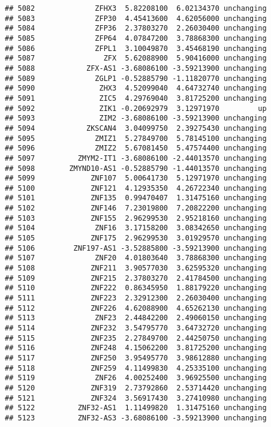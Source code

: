 \documentclass[]{article}
\begin{document}
\begin{verbatim}
## 5082              ZFHX3  5.82208100  6.02134370 unchanging
## 5083              ZFP30  4.45413600  4.62056000 unchanging
## 5084              ZFP36  2.37803270  2.26030400 unchanging
## 5085              ZFP64  4.07847200  3.78868300 unchanging
## 5086              ZFPL1  3.10049870  3.45468190 unchanging
## 5087                ZFX  5.62088900  5.90416000 unchanging
## 5088            ZFX-AS1 -3.68086100 -3.59213900 unchanging
## 5089              ZGLP1 -0.52885790 -1.11820770 unchanging
## 5090               ZHX3  4.52099040  4.64732740 unchanging
## 5091               ZIC5  4.29769040  3.81725200 unchanging
## 5092               ZIK1 -0.20692979  3.12971970         up
## 5093               ZIM2 -3.68086100 -3.59213900 unchanging
## 5094            ZKSCAN4  3.04099750  2.39275430 unchanging
## 5095              ZMIZ1  5.27849700  5.78145100 unchanging
## 5096              ZMIZ2  5.67081450  5.47574400 unchanging
## 5097          ZMYM2-IT1 -3.68086100 -2.44013570 unchanging
## 5098        ZMYND10-AS1 -0.52885790 -1.44013570 unchanging
## 5099             ZNF107  5.00641730  5.12971970 unchanging
## 5100             ZNF121  4.12935350  4.26722340 unchanging
## 5101             ZNF135  0.99470407  1.31475160 unchanging
## 5102             ZNF146  7.23019800  7.20822200 unchanging
## 5103             ZNF155  2.96299530  2.95218160 unchanging
## 5104              ZNF16  3.17158200  3.08342650 unchanging
## 5105             ZNF175  2.96299530  3.01929570 unchanging
## 5106         ZNF197-AS1 -3.52885800 -3.59213900 unchanging
## 5107              ZNF20  4.01803640  3.78868300 unchanging
## 5108             ZNF211  3.90577030  3.62595320 unchanging
## 5109             ZNF215  2.37803270  2.41784500 unchanging
## 5110             ZNF222  0.86345950  1.88179220 unchanging
## 5111             ZNF223  2.32912300  2.26030400 unchanging
## 5112             ZNF226  4.62088900  4.65262130 unchanging
## 5113              ZNF23  2.44842200  2.49060150 unchanging
## 5114             ZNF232  3.54795770  3.64732720 unchanging
## 5115             ZNF235  2.27849700  2.44250750 unchanging
## 5116             ZNF248  4.15062200  3.81725200 unchanging
## 5117             ZNF250  3.95495770  3.98612880 unchanging
## 5118             ZNF259  4.11499830  4.25335100 unchanging
## 5119              ZNF26  4.00252400  3.96925500 unchanging
## 5120             ZNF319  2.73792860  2.53714420 unchanging
## 5121             ZNF324  3.56917430  3.27410980 unchanging
## 5122          ZNF32-AS1  1.11499820  1.31475160 unchanging
## 5123          ZNF32-AS3 -3.68086100 -3.59213900 unchanging

\end{verbatim}
\end{document}
